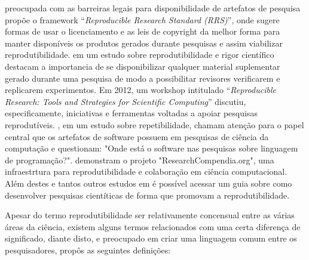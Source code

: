  preocupada com as barreiras legais para
disponibilidade de artefatos de pesquisa propõe o framework ``{\it Reproducible
Research Standard (RRS)}'', onde sugere formas de usar o licenciamento e as leis
de copyright da melhor forma para manter disponíveis os produtos gerados
durante pesquisas e assim viabilizar reprodutibilidade. 
em um estudo sobre reprodutibilidade e rigor científico destacam a importancia
de se disponibilizar qualquer material suplementar gerado durante uma pesquisa
de modo a possibilitar revisores verificarem e replicarem experimentos. Em
2012, um workshop intitulado ``{\it Reproducible Research: Tools and Strategies for
Scientific Computing}'' \cite{Stodden2012} discutiu, especificamente, iniciativas
e ferramentas voltadas a apoiar pesquisas reprodutíveis.
, em um estudo sobre repetibilidade, chamam
atenção para o papel central que os artefatos de software possuem em pesquisas
de ciência da computação e questionam: "Onde está o software nas pesquisas
sobre linguagem de programação?".  demonstram o
projeto "ResearchCompendia.org", uma infraestrtura para reprodutibilidade e
colaboração em ciência computacional. Além destes e tantos outros estudos em
\cite{GithubReproducibilityGuide} é possível acessar um guia sobre como
desenvolver pesquisas cientíticas de forma que promovam a reprodutibilidade.

%

%

Apesar do termo reprodutibilidade ser relativamente concensual entre as várias
áreas da ciência, existem alguns termos relacionados com uma certa diferença
de significado, diante disto, e preocupado em criar uma linguagem comum entre
os pesquisadores,  propôs as seguintes definições:

